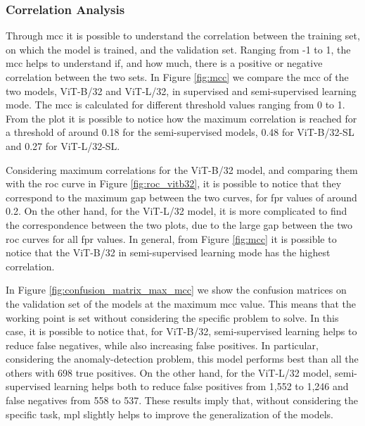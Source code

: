 \subsubsection{Correlation Analysis}
Through \acf{mcc} it is possible to understand the correlation between the 
training set, on which the model is trained, and the validation set. Ranging from 
-1 to 1, the \acs{mcc} helps to understand if, and how much, there is a positive 
or negative correlation between the two sets.
In Figure \ref{fig:mcc} we compare the \acs{mcc} of the two models, ViT-B/32 and 
ViT-L/32, in supervised and semi-supervised learning mode. The \acs{mcc} is 
calculated for different threshold values ranging from 0 to 1. From the plot it 
is possible to notice how the maximum correlation is reached for a threshold of 
around 0.18 for the semi-supervised models, 0.48 for ViT-B/32-SL and 0.27 for 
ViT-L/32-SL.

Considering maximum correlations for the ViT-B/32 model, and comparing them with 
the \acs{roc} curve in Figure \ref{fig:roc_vitb32}, it is possible to notice that 
they correspond to the maximum gap between the two curves, for \acs{fpr} values of
around 0.2. On the other hand, for the ViT-L/32 model, it is more complicated to 
find the correspondence between the two plots, due to the large gap between the 
two \acs{roc} curves for all \acs{fpr} values. In general, from Figure \ref{fig:mcc} 
it is possible to notice that the ViT-B/32 in semi-supervised learning mode has 
the highest correlation.

In Figure \ref{fig:confusion_matrix_max_mcc} we show the confusion matrices 
on the validation set of the models at the maximum \acs{mcc} value. This means 
that the working point is set without considering the specific problem to solve.
In this case, it is possible to notice that, for ViT-B/32, semi-supervised learning
helps to reduce false negatives, while also increasing false positives. 
In particular, considering the anomaly-detection problem, this model performs 
best than all the others with 698 true positives. On the other hand, for the 
ViT-L/32 model, semi-supervised learning helps both to reduce false positives 
from 1,552 to 1,246 and false negatives from 558 to 537.
These results imply that, without considering the specific task, \acl{mpl} slightly 
helps to improve the generalization of the models.

